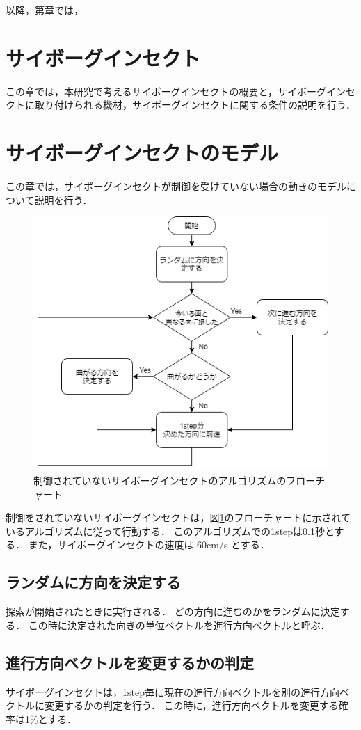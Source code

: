 \documentclass[a4paper,11pt]{jarticle}
\begin{document}
	以降，第章では，
	\section{サイボーグインセクト}
	この章では，本研究で考えるサイボーグインセクトの概要と，サイボーグインセクトに取り付けられる機材，サイボーグインセクトに関する条件の説明を行う．
	\section{サイボーグインセクトのモデル}
	この章では，サイボーグインセクトが制御を受けていない場合の動きのモデルについて説明を行う．
	
	
	\label{sec:algorithm}
	\begin{figure}
		\centering
		\includegraphics[width=0.5\linewidth]{png/Untitled.png}
		\caption[アルゴリズムのフローチャート]{制御されていないサイボーグインセクトのアルゴリズムのフローチャート}
		\label{fig:algorithm}
	\end{figure}
	
	制御をされていないサイボーグインセクトは，図\ref{fig:algorithm}のフローチャートに示されているアルゴリズムに従って行動する．
	このアルゴリズムでの1stepは0.1秒とする．
	また，サイボーグインセクトの速度は 60cm/s とする\cite{speed}．
	
	\subsection{ランダムに方向を決定する}
	\label{random}
	探索が開始されたときに実行される．
	どの方向に進むのかをランダムに決定する．
	この時に決定された向きの単位ベクトルを進行方向ベクトルと呼ぶ．
	
	\subsection{進行方向ベクトルを変更するかの判定}
	\label{carb}
	サイボーグインセクトは，1step毎に現在の進行方向ベクトルを別の進行方向ベクトルに変更するかの判定を行う．
	この時に，進行方向ベクトルを変更する確率は1\%とする．
	
\end{document}
